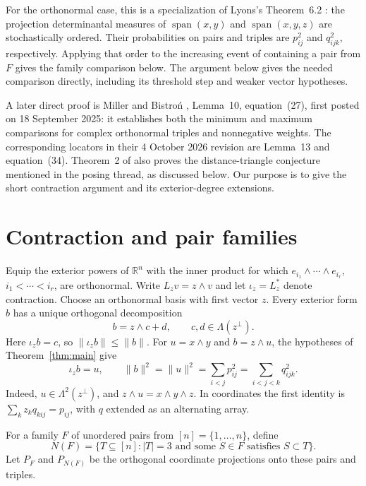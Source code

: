 \documentclass[11pt]{article}
\newcommand{\R}{\mathbb{R}}
\newcommand{\ii}{\iota_z}
\begin{document}
For the orthonormal case, this is a specialization of Lyons's
Theorem~6.2 \cite{lyons}: the projection determinantal measures of
$\operatorname{span}(x,y)$ and $\operatorname{span}(x,y,z)$ are stochastically
ordered. Their probabilities on pairs and triples are $p_{ij}^2$ and
$q_{ijk}^2$, respectively. Applying that order to the increasing event
of containing a pair from $F$ gives the family comparison below.
The argument below gives the needed comparison
directly, including its threshold step and weaker vector hypotheses.

A later direct proof is Miller and Bistro\'n \cite{mb1}, Lemma~10,
equation~(27), first posted on 18 September 2025: it establishes both
the minimum and maximum comparisons for complex orthonormal triples
and nonnegative weights. The corresponding locators in their
4 October 2026 revision \cite{mb4} are Lemma~13 and equation~(34).
Theorem~2 of \cite{mb1} also proves the distance-triangle conjecture
mentioned in the posing thread, as discussed below. Our purpose is to give
the short contraction argument and its exterior-degree extensions.

\section{Contraction and pair families}
Equip the exterior powers of $\R^n$ with the inner product for which
$e_{i_1}\wedge\cdots\wedge e_{i_r}$, $i_1<\cdots<i_r$, are orthonormal.
Write $L_z v=z\wedge v$ and let $\ii=L_z^*$ denote contraction.
Choose an orthonormal basis with first vector $z$. Every exterior form $b$
has a unique orthogonal decomposition
\[
 b=z\wedge c+d,\qquad c,d\in\Lambda(z^\perp).
\]
Here $\ii b=c$, so $\|\ii b\|\le\|b\|$.
For $u=x\wedge y$ and $b=z\wedge u$, the hypotheses of
Theorem~\ref{thm:main} give
\begin{equation}\label{eq:recover}
 \ii b=u,\qquad
 \|b\|^2=\|u\|^2=\sum_{i<j}p_{ij}^2=\sum_{i<j<k}q_{ijk}^2.
\end{equation}
Indeed, $u\in\Lambda^2(z^\perp)$, and $z\wedge u=x\wedge y\wedge z$.
In coordinates the first identity is
$\sum_k z_k q_{kij}=p_{ij}$, with $q$ extended as an alternating array.

For a family $F$ of unordered pairs from $[n]=\{1,\ldots,n\}$, define
\[
 N(F)=\{T\subseteq[n]: |T|=3\text{ and some }S\in F\text{ satisfies }S\subset T\}.
\]
Let $P_F$ and $P_{N(F)}$ be the orthogonal coordinate projections onto
these pairs and triples.
\end{document}
